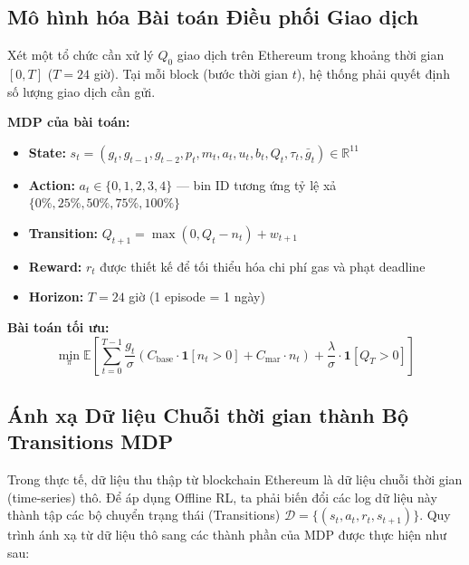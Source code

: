 \subsection{Mô hình hóa Bài toán Điều phối Giao dịch}

Xét một tổ chức cần xử lý $Q_0$ giao dịch trên Ethereum trong khoảng thời gian $[0, T]$ ($T = 24$ giờ). Tại mỗi block (bước thời gian $t$), hệ thống phải quyết định số lượng giao dịch cần gửi.

\textbf{MDP của bài toán:}
\begin{itemize}
    \item \textbf{State:} $s_t = (g_t, g_{t-1}, g_{t-2}, p_t, m_t, a_t, u_t, b_t, Q_t, \tau_t, \bar{g}_t) \in \mathbb{R}^{11}$
    \item \textbf{Action:} $a_t \in \{0, 1, 2, 3, 4\}$ — bin ID tương ứng tỷ lệ xả $\{0\%, 25\%, 50\%, 75\%, 100\%\}$
    \item \textbf{Transition:} $Q_{t+1} = \max(0, Q_t - n_t) + w_{t+1}$
    \item \textbf{Reward:} $r_t$ được thiết kế để tối thiểu hóa chi phí gas và phạt deadline
    \item \textbf{Horizon:} $T = 24$ giờ (1 episode = 1 ngày)
\end{itemize}

\textbf{Bài toán tối ưu:}
\begin{equation}
    \min_{\pi} \mathbb{E}\left[\sum_{t=0}^{T-1} \frac{g_t}{\sigma}\left(C_{\text{base}}\cdot\mathbf{1}[n_t>0] + C_{\text{mar}}\cdot n_t\right) + \frac{\lambda}{\sigma}\cdot\mathbf{1}[Q_T > 0]\right]
    \label{eq:objective}
\end{equation}

\subsection{Ánh xạ Dữ liệu Chuỗi thời gian thành Bộ Transitions MDP}

Trong thực tế, dữ liệu thu thập từ blockchain Ethereum là dữ liệu chuỗi thời gian (time-series) thô. Để áp dụng Offline RL, ta phải biến đổi các log dữ liệu này thành tập các bộ chuyển trạng thái (Transitions) $\mathcal{D} = \{(s_t, a_t, r_t, s_{t+1})\}$. Quy trình ánh xạ từ dữ liệu thô sang các thành phần của MDP được thực hiện như sau:

